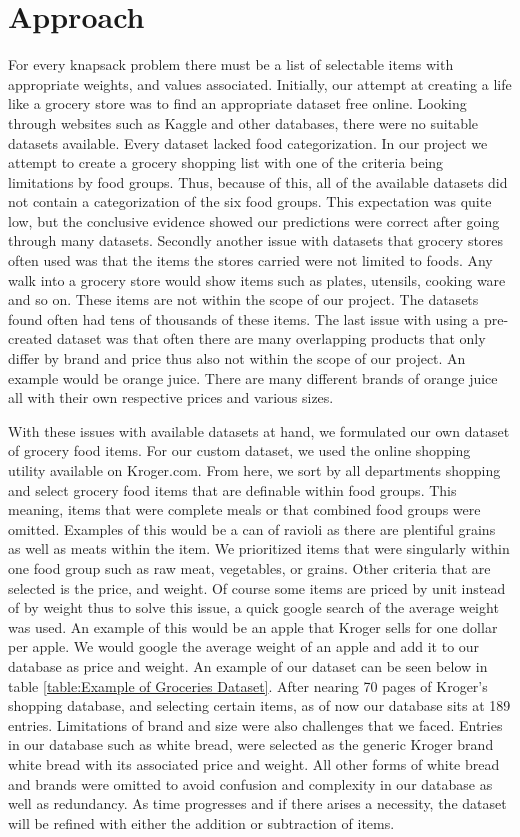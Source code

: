\documentclass[10pt,journal,compsoc]{IEEEtran}
\begin{document}
\section{Approach}
For every knapsack problem there must be a list of selectable items with
appropriate weights, and values associated. Initially, our attempt at creating a
life like a grocery store was to find an appropriate dataset free online.
Looking through websites such as Kaggle and other databases, there were no
suitable datasets available. Every dataset lacked food categorization. In our
project we attempt to create a grocery shopping list with one of the criteria
being limitations by food groups. Thus, because of this, all of the available
datasets did not contain a categorization of the six food groups. This
expectation was quite low, but the conclusive evidence showed our predictions
were correct after going through many datasets. Secondly another issue with
datasets that grocery stores often used was that the items the stores carried
were not limited to foods. Any walk into a grocery store would show items such
as plates, utensils, cooking ware and so on. These items are not within the
scope of our project. The datasets found often had tens of thousands of these
items. The last issue with using a pre-created dataset was that often there are
many overlapping products that only differ by brand and price thus also not
within the scope of our project. An example would be orange juice. There are
many different brands of orange juice all with their own respective prices and
various sizes. 

With these issues with available datasets at hand, we formulated our own dataset
of grocery food items. For our custom dataset, we used the online shopping
utility available on Kroger.com. From here, we sort by all departments shopping
and select grocery food items that are definable within food groups. This
meaning, items that were complete meals or that combined food groups were
omitted. Examples of this would be a can of ravioli as there are plentiful
grains as well as meats within the item. We prioritized items that were
singularly within one food group such as raw meat, vegetables, or grains. Other
criteria that are selected is the price, and weight. Of course some items are
priced by unit instead of by weight thus to solve this issue, a quick google
search of the average weight was used. An example of this would be an apple that
Kroger sells for one dollar per apple. We would google the average weight of an
apple and add it to our database as price and weight. An example of our dataset
can be seen below in table \ref{table:Example of Groceries Dataset}. After
nearing 70 pages of Kroger's shopping database, and selecting certain items, as
of now our database sits at 189 entries. Limitations of brand and size were also
challenges that we faced. Entries in our database such as white bread, were
selected as the generic Kroger brand white bread with its associated price and
weight. All other forms of white bread and brands were omitted to avoid
confusion and complexity in our database as well as redundancy. As time
progresses and if there arises a necessity, the dataset will be refined with
either the addition or subtraction of items.
\end{document}
